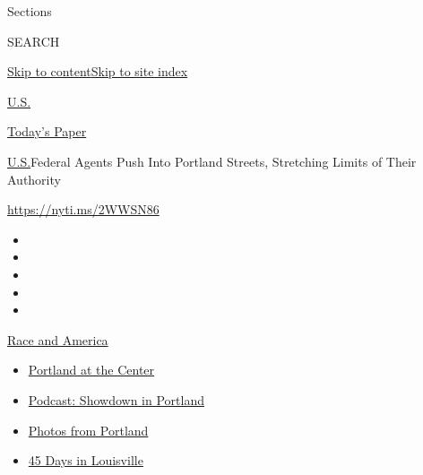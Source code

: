 Sections

SEARCH

\protect\hyperlink{site-content}{Skip to
content}\protect\hyperlink{site-index}{Skip to site index}

\href{https://www.nytimes3xbfgragh.onion/section/us}{U.S.}

\href{https://myaccount.nytimes3xbfgragh.onion/auth/login?response_type=cookie\&client_id=vi}{}

\href{https://www.nytimes3xbfgragh.onion/section/todayspaper}{Today's
Paper}

\href{/section/us}{U.S.}\textbar{}Federal Agents Push Into Portland
Streets, Stretching Limits of Their Authority

\url{https://nyti.ms/2WWSN86}

\begin{itemize}
\item
\item
\item
\item
\item
\end{itemize}

\href{https://www.nytimes3xbfgragh.onion/news-event/george-floyd-protests-minneapolis-new-york-los-angeles?action=click\&pgtype=Article\&state=default\&module=styln-george-floyd\&region=TOP_BANNER\&context=storylines_menu}{Race
and America}

\begin{itemize}
\tightlist
\item
  \href{https://www.nytimes3xbfgragh.onion/2020/07/24/us/portland-oregon-protests-white-race.html?action=click\&pgtype=Article\&state=default\&module=styln-george-floyd\&region=TOP_BANNER\&context=storylines_menu}{Portland
  at the Center}
\item
  \href{https://www.nytimes3xbfgragh.onion/2020/07/23/podcasts/the-daily/portland-protests.html?action=click\&pgtype=Article\&state=default\&module=styln-george-floyd\&region=TOP_BANNER\&context=storylines_menu}{Podcast:
  Showdown in Portland}
\item
  \href{https://www.nytimes3xbfgragh.onion/2020/07/21/us/portland-photos-protests.html?action=click\&pgtype=Article\&state=default\&module=styln-george-floyd\&region=TOP_BANNER\&context=storylines_menu}{Photos
  from Portland}
\item
  \href{https://www.nytimes3xbfgragh.onion/interactive/2020/07/16/us/black-lives-matter-protests-louisville-breonna-taylor.html?action=click\&pgtype=Article\&state=default\&module=styln-george-floyd\&region=TOP_BANNER\&context=storylines_menu}{45
  Days in Louisville}
\end{itemize}

